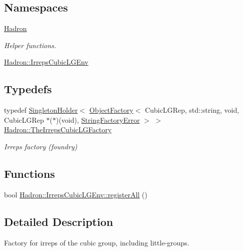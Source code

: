\subsection*{Namespaces}
\begin{DoxyCompactItemize}
\item 
 \mbox{\hyperlink{namespaceHadron}{Hadron}}
\begin{DoxyCompactList}\small\item\em Helper functions. \end{DoxyCompactList}\item 
 \mbox{\hyperlink{namespaceHadron_1_1IrrepsCubicLGEnv}{Hadron\+::\+Irreps\+Cubic\+L\+G\+Env}}
\end{DoxyCompactItemize}
\subsection*{Typedefs}
\begin{DoxyCompactItemize}
\item 
typedef \mbox{\hyperlink{classUtil_1_1SingletonHolder}{Singleton\+Holder}}$<$ \mbox{\hyperlink{classUtil_1_1ObjectFactory}{Object\+Factory}}$<$ Cubic\+L\+G\+Rep, std\+::string, void, Cubic\+L\+G\+Rep $\ast$($\ast$)(void), \mbox{\hyperlink{structUtil_1_1StringFactoryError}{String\+Factory\+Error}} $>$ $>$ \mbox{\hyperlink{namespaceHadron_a7b18115fc67c9fdbfd26511633229b99}{Hadron\+::\+The\+Irreps\+Cubic\+L\+G\+Factory}}
\begin{DoxyCompactList}\small\item\em Irreps factory (foundry) \end{DoxyCompactList}\end{DoxyCompactItemize}
\subsection*{Functions}
\begin{DoxyCompactItemize}
\item 
bool \mbox{\hyperlink{namespaceHadron_1_1IrrepsCubicLGEnv_a4c9a3cd2351dacf5ec8f2f58df4b7e3a}{Hadron\+::\+Irreps\+Cubic\+L\+G\+Env\+::register\+All}} ()
\end{DoxyCompactItemize}


\subsection{Detailed Description}
Factory for irreps of the cubic group, including little-\/groups. 

